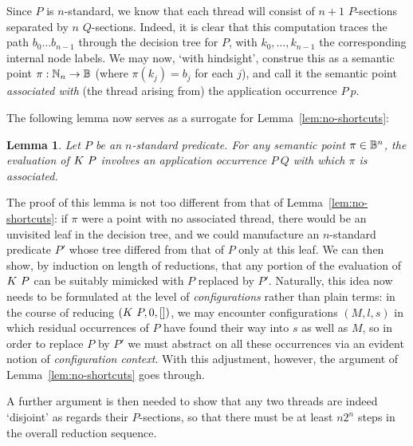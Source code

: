 \documentclass[12pt,phd,lfcs,twoside,openright,logo,leftchapter,normalheadings]{infthesis}
\theoremstyle{plain}
\newtheorem{lemma}[theorem]{Lemma}
\theoremstyle{definition}
\begin{document}
Since $P$ is $n$-standard, we know that each thread will consist of
$n+1$ $P$-sections separated by $n$ $Q$-sections.
%
Indeed, it is clear that this computation traces the path
$b_0 \ldots b_{n-1}$ through the decision tree for $P$, with
$k_0,\ldots,k_{n-1}$ the corresponding internal node labels.  We may
now, `with hindsight', construe this as a semantic point
$\pi : \mathbb{N}_n \to \mathbb{B}$ (where $\pi(k_j)=b_j$ for each $j$), and call it
the semantic point \emph{associated with} (the thread arising from)
the application occurrence $P~p$.

The following lemma now serves as a surrogate for
Lemma~\ref{lem:no-shortcuts}:

\begin{lemma}
  Let $P$ be an $n$-standard predicate. For any semantic point
  $\pi \in \mathbb{B}^n$, the evaluation of $K~P$ involves an
  application occurrence $P~Q$ with which $\pi$ is associated.
\end{lemma}
%
The proof of this lemma is not too different from that of
Lemma~\ref{lem:no-shortcuts}: if $\pi$ were a point with no associated
thread, there would be an unvisited leaf in the decision tree, and we
could manufacture an $n$-standard predicate $P'$ whose tree differed
from that of $P$ only at this leaf. We can then show, by induction on
length of reductions, that any portion of the evaluation of
$K~P$ can be suitably mimicked with $P$ replaced by $P'$.
Naturally, this idea now needs to be formulated at the level of
\emph{configurations} rather than plain terms: in the course of
reducing $(K~P,0,[])$, we may encounter configurations
$(M,l,s)$ in which residual occurrences of $P$ have found their way
into $s$ as well as $M$, so in order to replace $P$ by $P'$ we must
abstract on all these occurrences via an evident notion of
\emph{configuration context}.  With this adjustment, however, the
argument of Lemma~\ref{lem:no-shortcuts} goes through.

A further argument is then needed to show that any two threads are
indeed `disjoint' as regards their $P$-sections, so that there must be
at least $n2^n$ steps in the overall reduction sequence.

\end{document}
